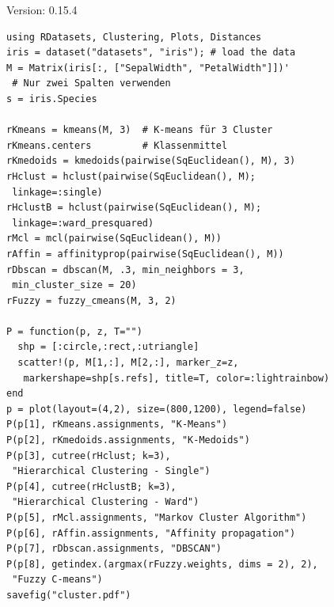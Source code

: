 \documentclass[10pt,twocolumn]{scrartcl}
\begin{document}
Version: 0.15.4

\begin{lstlisting}
using RDatasets, Clustering, Plots, Distances
iris = dataset("datasets", "iris"); # load the data
M = Matrix(iris[:, ["SepalWidth", "PetalWidth"]])'
 # Nur zwei Spalten verwenden
s = iris.Species

rKmeans = kmeans(M, 3)  # K-means für 3 Cluster
rKmeans.centers         # Klassenmittel
rKmedoids = kmedoids(pairwise(SqEuclidean(), M), 3)
rHclust = hclust(pairwise(SqEuclidean(), M);
 linkage=:single)
rHclustB = hclust(pairwise(SqEuclidean(), M);
 linkage=:ward_presquared)
rMcl = mcl(pairwise(SqEuclidean(), M))
rAffin = affinityprop(pairwise(SqEuclidean(), M))
rDbscan = dbscan(M, .3, min_neighbors = 3,
 min_cluster_size = 20)
rFuzzy = fuzzy_cmeans(M, 3, 2)

P = function(p, z, T="")
  shp = [:circle,:rect,:utriangle]
  scatter!(p, M[1,:], M[2,:], marker_z=z,
   markershape=shp[s.refs], title=T, color=:lightrainbow)
end 
p = plot(layout=(4,2), size=(800,1200), legend=false)
P(p[1], rKmeans.assignments, "K-Means")
P(p[2], rKmedoids.assignments, "K-Medoids")
P(p[3], cutree(rHclust; k=3),
 "Hierarchical Clustering - Single")
P(p[4], cutree(rHclustB; k=3),
 "Hierarchical Clustering - Ward")
P(p[5], rMcl.assignments, "Markov Cluster Algorithm")
P(p[6], rAffin.assignments, "Affinity propagation")
P(p[7], rDbscan.assignments, "DBSCAN")
P(p[8], getindex.(argmax(rFuzzy.weights, dims = 2), 2),
 "Fuzzy C-means")
savefig("cluster.pdf")
\end{lstlisting}
\end{document}
